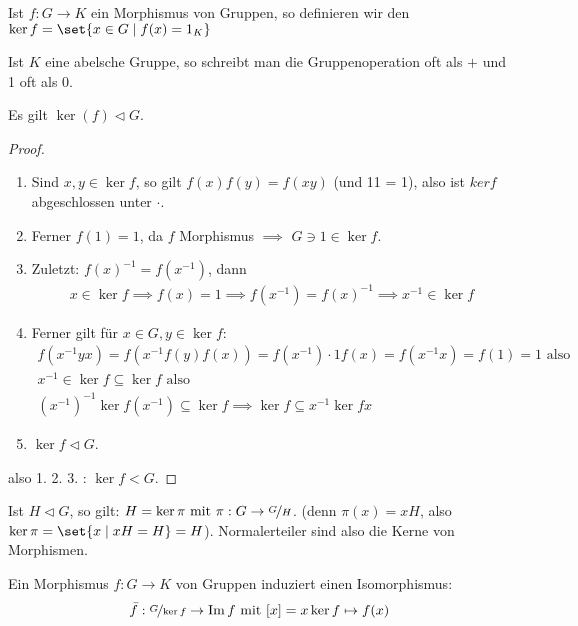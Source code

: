 \begin{definition}
	Ist $f: G \to K$ ein Morphismus von Gruppen, so definieren wir den  $\ker f = \set{x \in G \mid f(x) = 1_K}$
\end{definition}
\begin{*remark}
	Ist $K$ eine abelsche Gruppe, so schreibt man die Gruppenoperation oft als $+$ und 1 oft als 0.
\end{*remark}
\begin{proposition}
	Es gilt $\ker(f) \lhd G$.
\end{proposition}
\begin{proof} %
	\begin{enumerate}
		\item Sind $x,y \in \ker f$, so gilt $f(x)f(y) = f(xy)$ (und 11 = 1), also ist $ker f$ abgeschlossen unter $\cdot$.
		\item Ferner $f(1) = 1$, da $f$ Morphismus $\implies$ $G \ni 1 \in \ker f$.
		\item 	Zuletzt: $f(x)^{-1} = f(x^{-1})$, dann
		\begin{align*}
		x \in \ker f \implies f(x) = 1 \implies f(x^{-1}) = f(x)^{-1} \implies x^{-1} \in \ker f
		\end{align*}
		\item Ferner gilt für $x \in G, y \in \ker f$:
		\begin{align*}
		f(x^{-1}yx) = f(x^{-1}f(y)f(x)) = f(x^{-1})\cdot 1 f(x) = f(x^{-1}x) = f(1) = 1 \text{ also}\\
		x^{-1} \in \ker f \subseteq \ker f \text{ also }\\
		(x^{-1})^{-1} \ker f (x^{-1}) \subseteq \ker f \implies \ker f \subseteq x^{-1} \ker f x
		\end{align*}
		\item $\ker f \lhd G$.
	\end{enumerate}
	also 1. 2. 3. : $\ker f < G$. 
\end{proof}
\begin{*remark}
	Ist $H \lhd G$, so gilt: $H = \ker \pi \mit \pi: G \to \lnkset{G}{H}$. (denn $\pi(x) = xH$, also $\ker \pi = \set{x \mid xH = H} = H$). Normalerteiler sind also die Kerne von Morphismen.
\end{*remark}
\begin{proposition}[1. Isomorphiesatz]
	Ein Morphismus $f: G \to K$ von Gruppen induziert einen Isomorphismus:
	\begin{align*}
		\bar{f}: \lnkset{G}{\ker f} \to \Image f \mit [x] = x \ker f \mapsto f(x)
	\end{align*}
\end{proposition}
